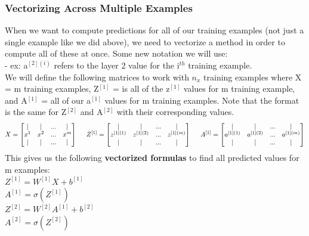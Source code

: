 \documentclass[11pt, a4paper]{article}
\begin{document}
\begin{spacing}{1.1}
	\subsubsection{Vectorizing Across Multiple Examples}
	When we want to compute predictions for all of our training examples (not just a single example like we did above), we need to vectorize a method in order to compute all of these at once. Some new notation we will use: \vspace*{1mm} \\
	\hspace*{3mm} - ex: a$^{[2](i)}$ refers to the layer 2 value for the i$^{th}$ training example. \vspace*{1mm} \\
	We will define the following matrices to work with $n_x$ training examples where X = m training examples, Z$^{[1]}$ = is all of the z$^{[1]}$ values for m training example, and A$^{[1]}$ = all of our a$^{[1]}$ values for m training examples. Note that the format is the same for Z$^{[2]}$ and A$^{[2]}$ with their corresponding values. $$ X = \begin{bmatrix} | & | & ... & | \\ x^1 & x^2 & ... & x^m \\ | & | & ... & | \end{bmatrix} \hspace*{5mm} Z^{[1]} = \begin{bmatrix} | & | & ... & | \\ z^{[1](1)} & z^{[1](2)}  & ... & z^{[1](m)}  \\ | & | & ... & | \end{bmatrix} \hspace*{5mm} A^{[1]} = \begin{bmatrix} | & | & ... & | \\ a^{[1](1)} & a^{[1](2)}  & ... & a^{[1](m)}  \\ | & | & ... & | \end{bmatrix} $$
	This gives us the following \textbf{vectorized formulas} to find all predicted values for m examples: \vspace*{1mm} \\
	\hspace*{3mm} $Z^{[1]} = W^{[1]}X + b^{[1]}$  \vspace*{1mm} \\
	\hspace*{3mm} $A^{[1]} = \sigma(Z^{[1]})$  \vspace*{1mm} \\
	\hspace*{3mm} $Z^{[2]} = W^{[2]}A^{[1]} + b^{[2]}$  \vspace*{1mm} \\
	\hspace*{3mm} $A^{[2]} = \sigma(Z^{[2]})$ 

\end{spacing}
\end{document}
